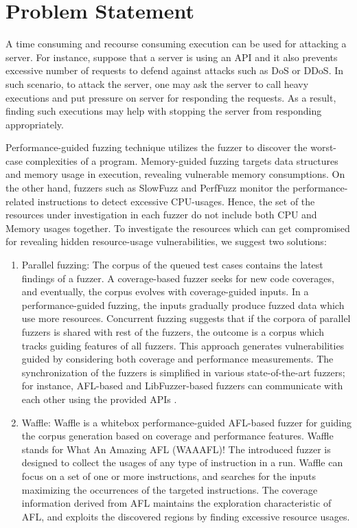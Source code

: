 \section{Problem Statement}

A time consuming and recourse consuming execution can be used for attacking a server. For instance, suppose that a server is using an API and it also prevents excessive number of requests to defend against attacks such as DoS or DDoS. In such scenario, to attack the server, one may ask the server to call heavy executions and put pressure on server for responding the requests. As a result, finding such executions may help with stopping the server from responding appropriately. 

Performance-guided fuzzing technique utilizes the fuzzer to discover the worst-case complexities of a program. Memory-guided fuzzing targets data structures and memory usage in execution, revealing vulnerable memory consumptions. On the other hand, fuzzers such as SlowFuzz and PerfFuzz monitor the performance-related instructions to detect excessive CPU-usages. Hence, the set of the resources under investigation in each fuzzer do not include both CPU and Memory usages together. To investigate the resources which can get compromised for revealing hidden resource-usage vulnerabilities, we suggest two solutions:

\begin{enumerate}
    \item Parallel fuzzing: The corpus of the queued test cases contains the latest findings of a fuzzer. A coverage-based fuzzer seeks for new code coverages, and eventually, the corpus evolves with coverage-guided inputs. In a performance-guided fuzzing, the inputs gradually produce fuzzed data which use more resources. Concurrent fuzzing suggests that if the corpora of parallel fuzzers is shared with rest of the fuzzers, the outcome is a corpus which tracks guiding features of all fuzzers. This approach generates vulnerabilities guided by considering both coverage and performance measurements. The synchronization of the fuzzers is simplified in various state-of-the-art fuzzers; for instance, AFL-based and LibFuzzer-based fuzzers can communicate with each other using the provided APIs \cite{afl_par}.
    
    \item Waffle: Waffle is a whitebox performance-guided AFL-based fuzzer for guiding the corpus generation based on coverage and performance features. Waffle stands for What An Amazing AFL (WAAAFL)! The introduced fuzzer is designed to collect the usages of any type of instruction in a run. Waffle can focus on a set of one or more instructions, and searches for the inputs maximizing the occurrences of the targeted instructions. The coverage information derived from AFL maintains the exploration characteristic of AFL, and exploits the discovered regions by finding excessive resource usages.
\end{enumerate}




